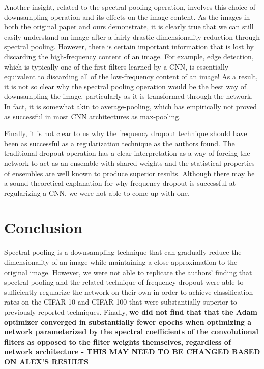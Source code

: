 \documentclass[10pt,journal,compsoc]{IEEEtran}
\begin{document}
Another insight, related to the spectral pooling operation, involves this choice of downsampling operation and its effects on the image content. As the images in both the original paper and ours demonstrate, it is clearly true that we can still easily understand an image after a fairly drastic dimensionality reduction through spectral pooling. However, there is certain important information that is lost by discarding the high-frequency content of an image. For example, edge detection, which is typically one of the first filters learned by a CNN, is essentially equivalent to discarding all of the low-frequency content of an image! As a result, it is not so clear why the spectral pooling operation would be the best way of downsampling the image, particularly as it is transformed through the network. In fact, it is somewhat akin to average-pooling, which has empirically not proved as successful in most CNN architectures as max-pooling. 

Finally, it is not clear to us why the frequency dropout technique should have been as successful as a regularization technique as the authors found. The traditional dropout operation has a clear interpretation as a way of forcing the network to act as an ensemble with shared weights and the statistical properties of ensembles are well known to produce superior results. Although there may be a sound theoretical explanation for why frequency dropout is successful at regularizing a CNN, we were not able to come up with one.

\section{Conclusion}

Spectral pooling is a downsampling technique that can gradually reduce the dimensionality of an image while maintaining a close approximation to the original image. However, we were not able to replicate the authors' finding that spectral pooling and the related technique of frequency dropout were able to sufficiently regularize the network on their own in order to achieve classification rates on the CIFAR-10 and CIFAR-100 that were substantially superior to previously reported techniques. Finally, \textbf{we did not find that that the Adam optimizer converged in substantially fewer epochs when optimizing a network parameterized by the spectral coefficients of the convolutional filters as opposed to the filter weights themselves, regardless of network architecture - THIS MAY NEED TO BE CHANGED BASED ON ALEX'S RESULTS}
\end{document}
